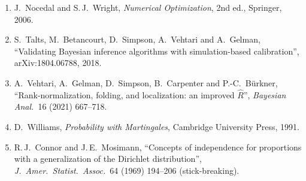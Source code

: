 \documentclass[11pt]{article}
\theoremstyle{definition}
\theoremstyle{remark}
\begin{document}
\begin{enumerate}
\item[{[15]}] J.\ Nocedal and S.\,J.\ Wright, \emph{Numerical Optimization}, 2nd ed., Springer, 2006.
\item[{[16]}] S.\ Talts, M.\ Betancourt, D.\ Simpson, A.\ Vehtari and A.\ Gelman, ``Validating Bayesian inference algorithms with simulation-based calibration'', arXiv:1804.06788, 2018.
\item[{[17]}] A.\ Vehtari, A.\ Gelman, D.\ Simpson, B.\ Carpenter and P.-C.\ B\"urkner, ``Rank-normalization, folding, and localization: an improved $\hat R$'', \emph{Bayesian Anal.}\ 16 (2021) 667--718.
\item[{[18]}] D.\ Williams, \emph{Probability with Martingales}, Cambridge University Press, 1991.
\item[{[19]}] R.\,J.\ Connor and J.\,E.\ Mosimann, ``Concepts of independence for proportions with a generalization of the Dirichlet distribution'', \emph{J.\ Amer.\ Statist.\ Assoc.}\ 64 (1969) 194--206 (stick-breaking).
\end{enumerate}
\end{document}
